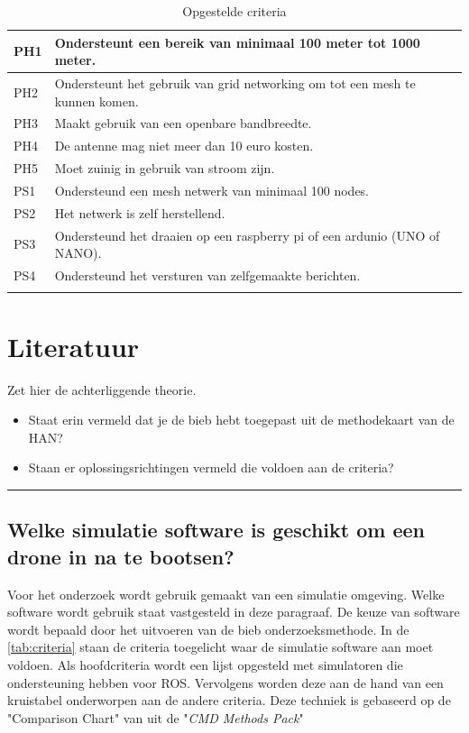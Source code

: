 \documentclass[a4paper, 11pt, oneside]{report}
\begin{document}
\begin{longtable}{|l|l|l|}
		PH1		& Ondersteunt een bereik van minimaal 100 meter tot 1000 meter.  \\ \hline
		PH2		& Ondersteunt het gebruik van grid networking om tot een mesh te kunnen komen.  \\ \hline
		PH3		& Maakt gebruik van een openbare bandbreedte.\\ \hline
		PH4		& De antenne mag niet meer dan 10 euro kosten. \\ \hline
		PH5		& Moet zuinig in gebruik van stroom zijn. \\ \hline
		PS1		& Ondersteund een mesh netwerk van minimaal 100 nodes. \\ \hline
		PS2		& Het netwerk is zelf herstellend. \\ \hline
		PS3		& Ondersteund het draaien op een raspberry pi of een ardunio (UNO of NANO). \\ \hline
		PS4		& Ondersteund het versturen van zelfgemaakte berichten. \\ \hline
		
	\caption{Opgestelde criteria}
	\label{tab:criteria}
\end{longtable}

\chapter{Literatuur}

Zet hier de achterliggende theorie.
\begin{itemize}
\item Staat erin vermeld dat je de bieb hebt toegepast uit de methodekaart van de HAN?
\item Staan er oplossingsrichtingen vermeld die voldoen aan de criteria?
\end{itemize}
\hrule

\section{Welke simulatie software is geschikt om een drone in na te bootsen?}

Voor het onderzoek wordt gebruik gemaakt van een simulatie omgeving.
Welke software wordt gebruik staat vastgesteld in deze paragraaf.
De keuze van software wordt bepaald door het uitvoeren van de bieb onderzoeksmethode. 
In de \autoref{tab:criteria} staan de criteria toegelicht waar de simulatie software aan moet voldoen.
Als hoofdcriteria wordt een lijst opgesteld met simulatoren die ondersteuning hebben voor ROS.
Vervolgens worden deze aan de hand van een kruistabel onderworpen aan de andere criteria.
Deze techniek is gebaseerd op de "Comparison Chart" van \cite{CMDmethod} uit de "\textit{CMD Methods Pack}"
\end{document}
